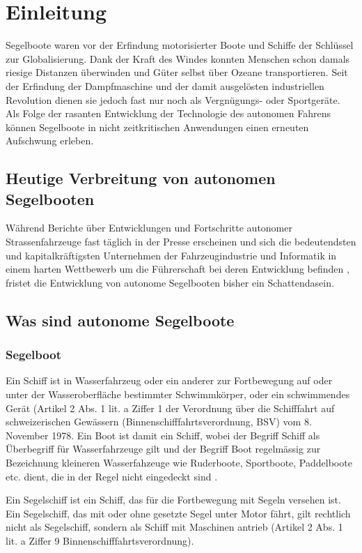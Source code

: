 
\chapter{Einleitung }
\label{chap:einleitung}
Segelboote waren vor der Erfindung motorisierter Boote und Schiffe der Schlüssel zur Globalisierung. Dank der Kraft des Windes konnten Menschen schon damals riesige Distanzen überwinden und Güter selbst über Ozeane transportieren. Seit der Erfindung der Dampfmaschine und der damit ausgelösten industriellen Revolution dienen sie jedoch fast nur noch als Vergnügungs- oder Sportgeräte. Als Folge der rasanten Entwicklung der Technologie des autonomen Fahrens können Segelboote in nicht zeitkritischen Anwendungen einen erneuten Aufschwung erleben.


\section{Heutige Verbreitung von autonomen Segelbooten}
Während Berichte über Entwicklungen und Fortschritte autonomer Strassenfahrzeuge fast täglich in der Presse erscheinen und sich die bedeutendsten und kapitalkräftigsten Unternehmen der Fahrzeugindustrie und Informatik in einem harten Wettbewerb um die Führerschaft bei deren Entwicklung befinden \cite{noauthor_autonomes_2023}, fristet die Entwicklung von autonome Segelbooten bisher ein Schattendasein. 

\section{Was sind autonome Segelboote}
\subsection{Segelboot}
Ein Schiff ist in Wasserfahrzeug oder ein anderer zur Fortbewegung auf oder unter der Wasseroberfläche bestimmter Schwimmkörper, oder ein schwimmendes Gerät (Artikel 2 Abs. 1 lit. a Ziffer 1 der Verordnung über die Schifffahrt auf schweizerischen Gewässern (Binnenschifffahrtsverordnung, BSV) vom 8. November 1978. Ein Boot ist damit ein Schiff, wobei der Begriff Schiff als Überbegriff für Wasserfahrzeuge gilt und der Begriff Boot regelmässig zur Bezeichnung kleineren Wasserfahzeuge wie Ruderboote, Sportboote, Paddelboote etc. dient, die in der Regel nicht eingedeckt sind \cite{noauthor_boot_2023}. 

Ein Segelschiff ist ein Schiff, das für die Fortbewegung mit Segeln versehen ist. Ein Segelschiff, das mit oder ohne gesetzte Segel unter Motor fährt, gilt rechtlich nicht als Segelschiff, sondern als Schiff mit Maschinen antrieb (Artikel 2 Abs. 1 lit. a Ziffer 9 Binnenschifffahrtsverordnung). 

